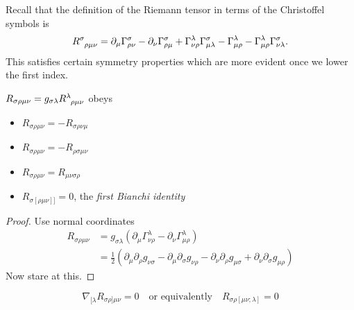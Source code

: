 Recall that the definition of the Riemann tensor in terms of the Christoffel symbols is
\begin{equation}
  R \indices{^{\sigma}_{\rho\mu\nu}} = \partial_{\mu} \Gamma^{\sigma}_{\rho\nu} - \partial_{\nu} \Gamma^{\sigma}_{\rho\mu} + \Gamma^{\lambda}_{\nu\rho} \Gamma^{\sigma}_{\mu\lambda} - \Gamma^{\lambda}_{\mu\rho} - \Gamma^{\lambda}_{\mu\rho} \Gamma^{\sigma}_{\nu\lambda}.
\end{equation}
This satisfies certain symmetry properties which are more evident once we lower the first index.
\begin{claim}
  $R_{\sigma\rho\mu\nu} = g_{\sigma\lambda} R \indices{^{\lambda}_{\rho\mu\nu}}$ obeys
  \begin{itemize}
    \item $R_{\sigma\rho\mu\nu} = -R_{\sigma\rho\nu\mu}$
    \item $R_{\sigma\rho\mu\nu} = - R_{\rho\sigma\mu\nu}$
    \item $R_{\sigma\rho\mu\nu} = R_{\mu\nu\sigma\rho}$
    \item $R_{\sigma[\rho\mu\nu]]} = 0$, the \emph{first Bianchi identity}
  \end{itemize}
\end{claim}
\begin{proof}
  Use normal coordinates
  \begin{align}
    R_{\sigma\rho\mu\nu} &= g_{\sigma\lambda} (\partial_{\mu} \Gamma^{\lambda}_{\nu\rho} -\partial_{\nu} \Gamma^{\lambda}_{\mu\rho}) \\
			 &= \frac{1}{2} (\partial_{\mu} \partial_{\rho} g_{\nu\sigma} - \partial_{\mu} \partial_{\sigma} g_{\nu\rho} - \partial_{\nu} \partial_{\rho} g_{\mu\sigma} + \partial_{\nu} \partial_{\sigma} g_{\mu\rho})
  \end{align}
  Now stare at this.
\end{proof}
\begin{claim}
\begin{equation}
  \nabla_{[\lambda} R_{\sigma\rho] \mu\nu} = 0 \quad \text{or equivalently} \quad R_{\sigma\rho[\mu\nu;\lambda]} = 0
\end{equation}
\end{claim}
